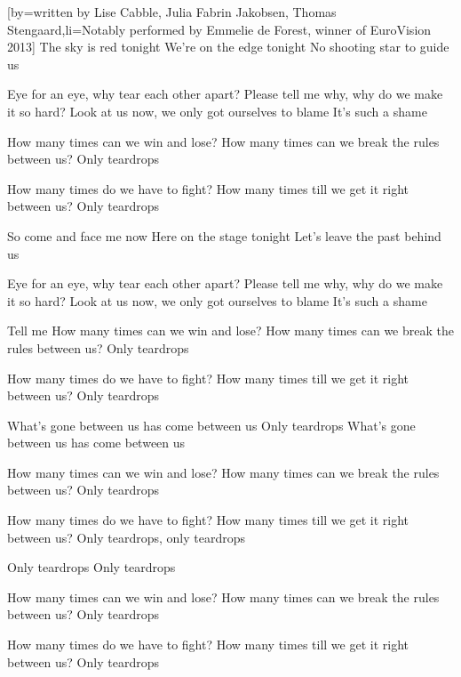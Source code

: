 [by={written by Lise Cabble, Julia Fabrin Jakobsen, Thomas Stengaard},li={Notably performed by Emmelie de Forest, winner of EuroVision 2013}]
\beginverse
The sky is red tonight
We’re on the edge tonight
No shooting star to guide us
\endverse

\beginverse
Eye for an eye, why tear each other apart?
Please tell me why, why do we make it so hard?
Look at us now, we only got ourselves to blame
It’s such a shame
\endverse

\beginchorus
How many times can we win and lose?
How many times can we break the rules between us?
Only teardrops

How many times do we have to fight?
How many times till we get it right between us?
Only teardrops
\endchorus

\beginverse
So come and face me now
Here on the stage tonight
Let’s leave the past behind us

Eye for an eye, why tear each other apart?
Please tell me why, why do we make it so hard?
Look at us now, we only got ourselves to blame
It’s such a shame
\endverse

\beginchorus
Tell me
How many times can we win and lose?
How many times can we break the rules between us?
Only teardrops

How many times do we have to fight?
How many times till we get it right between us?
Only teardrops
\endchorus

\beginchorus
{} What’s gone between us has come between us
Only teardrops
 What’s gone between us has come between us

How many times can we win and lose?
How many times can we break the rules between us?
Only teardrops

How many times do we have to fight?
How many times till we get it right between us?
Only teardrops, only teardrops

Only teardrops
Only teardrops

How many times can we win and lose?
How many times can we break the rules between us?
Only teardrops

How many times do we have to fight?
How many times till we get it right between us?
Only teardrops
\endchorus
\endsong